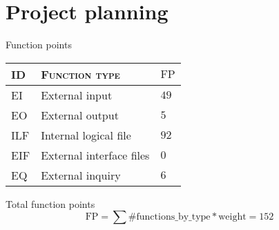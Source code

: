    \section{Project planning}

\newcommand{\mSize}{\mathbf{s}}
\newcommand{\mFP}{\text{FP}}
\newcommand{\mEffort}{\mathbf{e}}
\newcommand{\eaf}{\text{EAF}}  %


\begin{frame}{Function points}


\begin{tabularx}{\textwidth}{ >{\small\ttfamily}C{1cm} >{\small}X >{\small}C{1.5cm} }

\toprule
\normalfont\textsc{ID} & \normalfont\textsc{Function type} & $ \mFP $ \\

\toprule

	EI & External input				& $49$ \\
\midrule
	EO & External output				& $5$ \\
\midrule
	ILF & Internal logical file		& $92$ \\
\midrule
	EIF & External interface files	& $0$ \\
\midrule
	EQ & External inquiry			& $6$\\
\bottomrule

\end{tabularx}


\begin{block}{Total function points}\begin{equation*}
%
\mFP = \sum \text{\#functions\_by\_type} * \text{weight} = 152
%
\end{equation*}\end{block}




\end{frame}





